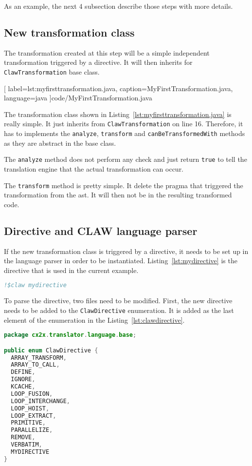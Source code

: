 As an example, the next 4 subsection describe those steps with more details.

\subsection{New transformation class}
The transformation created at this step will be a simple independent
transformation triggered by a directive. It will then inherits for 
\lstinline|ClawTransformation| base class.


  [
    label=lst:myfirsttransformation.java,
    caption=MyFirstTransformation.java,
    language=java
  ]{code/MyFirstTransformation.java}

The transformation class shown in Listing~\ref{lst:myfirsttransformation.java}
is really simple. It just inherits from \lstinline|ClawTransformation| on line
16. Therefore, it has to implements the \lstinline|analyze|,
\lstinline|transform| and \lstinline|canBeTransformedWith| methods as they are
abstract in the base class.

The \lstinline|analyze| method does not perform any check and just return
\lstinline|true| to tell the translation engine that the actual
transformation can occur.

The \lstinline|transform| method is pretty simple. It delete the pragma that
triggered the transformation from the \gls{ast}. It will then not be in the
resulting transformed code.

\subsection{Directive and CLAW language parser}
If the new transformation class is triggered by a directive, it needs to
be set up in the language parser in order to be instantiated. 
Listing~\ref{lst:mydirective} is the directive that is used in 
the current example.

\begin{lstlisting}[label=lst:mydirective, caption=Example directive, language=fortran]
!$claw mydirective
\end{lstlisting}

To parse the directive, two files need to be modified. First, the new directive
needs to be added to the \lstinline|ClawDirective| enumeration. It is added as
the last element of the enumeration in the Listing~\ref{lst:clawdirective}.

\begin{lstlisting}[label=lst:clawdirective, caption=ClawDirective.java, language=java]
package cx2x.translator.language.base;

public enum ClawDirective {
  ARRAY_TRANSFORM,
  ARRAY_TO_CALL,
  DEFINE,
  IGNORE,
  KCACHE,
  LOOP_FUSION,
  LOOP_INTERCHANGE,
  LOOP_HOIST,
  LOOP_EXTRACT,
  PRIMITIVE,
  PARALLELIZE,
  REMOVE,
  VERBATIM,
  MYDIRECTIVE
}
\end{lstlisting}

